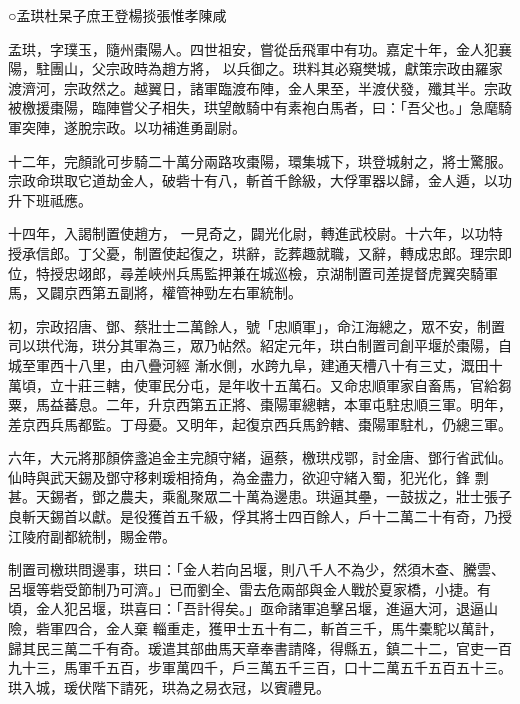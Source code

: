 
\begin{pinyinscope}

 ○孟珙杜杲子庶王登楊掞張惟孝陳咸



 孟珙，字璞玉，隨州棗陽人。四世祖安，嘗從岳飛軍中有功。嘉定十年，金人犯襄陽，駐團山，父宗政時為趙方將，
 以兵御之。珙料其必窺樊城，獻策宗政由羅家渡濟河，宗政然之。越翼日，諸軍臨渡布陣，金人果至，半渡伏發，殲其半。宗政被檄援棗陽，臨陣嘗父子相失，珙望敵騎中有素袍白馬者，曰：「吾父也。」急麾騎軍突陣，遂脫宗政。以功補進勇副尉。



 十二年，完顏訛可步騎二十萬分兩路攻棗陽，環集城下，珙登城射之，將士驚服。宗政命珙取它道劫金人，破砦十有八，斬首千餘級，大俘軍器以歸，金人遁，以功升下班祗應。



 十四年，入謁制置使趙方，
 一見奇之，闢光化尉，轉進武校尉。十六年，以功特授承信郎。丁父憂，制置使起復之，珙辭，訖葬趣就職，又辭，轉成忠郎。理宗即位，特授忠翊郎，尋差峽州兵馬監押兼在城巡檢，京湖制置司差提督虎翼突騎軍馬，又闢京西第五副將，權管神勁左右軍統制。



 初，宗政招唐、鄧、蔡壯士二萬餘人，號「忠順軍」，命江海總之，眾不安，制置司以珙代海，珙分其軍為三，眾乃帖然。紹定元年，珙白制置司創平堰於棗陽，自城至軍西十八里，由八疊河經
 漸水側，水跨九阜，建通天槽八十有三丈，溉田十萬頃，立十莊三轄，使軍民分屯，是年收十五萬石。又命忠順軍家自畜馬，官給芻粟，馬益蕃息。二年，升京西第五正將、棗陽軍總轄，本軍屯駐忠順三軍。明年，差京西兵馬都監。丁母憂。又明年，起復京西兵馬鈐轄、棗陽軍駐札，仍總三軍。



 六年，大元將那顏倴盞追金主完顏守緒，逼蔡，檄珙戍鄂，討金唐、鄧行省武仙。仙時與武天錫及鄧守移剌瑗相掎角，為金盡力，欲迎守緒入蜀，犯光化，鋒
 剽甚。天錫者，鄧之農夫，乘亂聚眾二十萬為邊患。珙逼其壘，一鼓拔之，壯士張子良斬天錫首以獻。是役獲首五千級，俘其將士四百餘人，戶十二萬二十有奇，乃授江陵府副都統制，賜金帶。



 制置司檄珙問邊事，珙曰：「金人若向呂堰，則八千人不為少，然須木查、騰雲、呂堰等砦受節制乃可濟。」已而劉全、雷去危兩部與金人戰於夏家橋，小捷。有頃，金人犯呂堰，珙喜曰：「吾計得矣。」亟命諸軍追擊呂堰，進逼大河，退逼山險，砦軍四合，金人棄
 輜重走，獲甲士五十有二，斬首三千，馬牛橐駝以萬計，歸其民三萬二千有奇。瑗遣其部曲馬天章奉書請降，得縣五，鎮二十二，官吏一百九十三，馬軍千五百，步軍萬四千，戶三萬五千三百，口十二萬五千五百五十三。珙入城，瑗伏階下請死，珙為之易衣冠，以賓禮見。




\end{pinyinscope}
